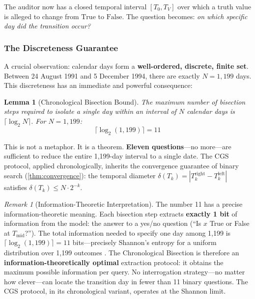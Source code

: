 \documentclass[11pt,a4paper]{article}
\theoremstyle{definition}
\theoremstyle{plain}
\newtheorem{lemma}[theorem]{Lemma}
\theoremstyle{remark}
\newtheorem{remark}{Remark}[section]
\begin{document}
The auditor now has a closed temporal interval $[T_0, T_V]$ over which a truth value is alleged to change from $\mathrm{True}$ to $\mathrm{False}$. The question becomes: \emph{on which specific day did the transition occur?}

\subsubsection{The Discreteness Guarantee}

A crucial observation: calendar days form a \textbf{well-ordered, discrete, finite set}. Between 24 August 1991 and 5 December 1994, there are exactly $N = 1{,}199$ days. This discreteness has an immediate and powerful consequence:

\begin{lemma}[Chronological Bisection Bound]\label{lem:chrono-bound}
The maximum number of bisection steps required to isolate a single day within an interval of $N$ calendar days is $\lceil \log_2 N \rceil$. For $N = 1{,}199$:
\begin{equation}
  \lceil \log_2(1{,}199) \rceil = 11
\end{equation}
\end{lemma}

This is not a metaphor. It is a theorem. \textbf{Eleven questions}---no more---are sufficient to reduce the entire 1,199-day interval to a single date. The CGS protocol, applied chronologically, inherits the convergence guarantee of binary search (\cref{thm:convergence}): the temporal diameter $\delta(T_k) = |T_k^{\mathrm{right}} - T_k^{\mathrm{left}}|$ satisfies $\delta(T_k) \leq N \cdot 2^{-k}$.

\begin{remark}[Information-Theoretic Interpretation]
The number 11 has a precise information-theoretic meaning. Each bisection step extracts \textbf{exactly 1 bit} of information from the model: the answer to a yes/no question (``Is $x$ True or False at $T_{\mathrm{mid}}$?''). The total information needed to specify one day among 1,199 is $\lceil \log_2(1{,}199) \rceil = 11$ bits---precisely Shannon's entropy for a uniform distribution over 1,199 outcomes \cite{shannon1948}. The Chronological Bisection is therefore an \textbf{information-theoretically optimal} extraction protocol: it obtains the maximum possible information per query. No interrogation strategy---no matter how clever---can locate the transition day in fewer than 11 binary questions. The CGS protocol, in its chronological variant, operates at the Shannon limit.
\end{remark}
\end{document}

